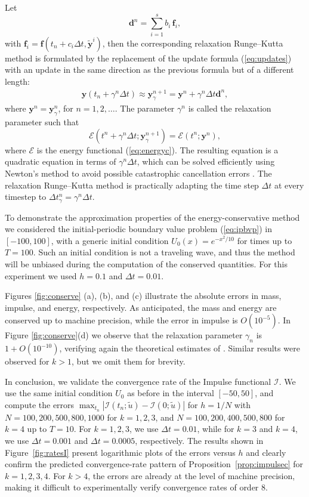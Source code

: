 \documentclass{amsart}
\newcommand{\bd}{\mathbf{d}}
\newcommand{\by}{\mathbf{y}}
\newcommand{\btf}{\mathbf{f}}
\begin{document}
Let
$$\bd^n=\sum_{i=1}^s b_i \,\btf_i,$$
with $\btf_i=\btf(t_n+c_i\Delta t,\tilde{\by}^i)$, then the corresponding
relaxation Runge--Kutta method is formulated by the replacement of the update
formula (\ref{eq:updates}) with an update in the same direction as the previous
formula but of a different length:
\begin{align}\label{eq:rrkupdate}
\by(t_n+\gamma^n\Delta t)\approx \by_\gamma^{n+1}=\by^n+\gamma^n\Delta t \bd^n,
\end{align}
where $\by^n=\by^{n}_\gamma$, for $n=1,2,\ldots$.
The parameter $\gamma^n$ is called the relaxation parameter such that
$$\mathcal{E}(t^{n}+\gamma^n\Delta t; \by^{n+1}_\gamma)=\mathcal{E}(t^n;\by^n),$$
where $\mathcal{E}$ is the energy functional (\ref{eq:energyc}). The resulting equation is a quadratic equation in terms of $\gamma^n \Delta t$, which can be solved efficiently using Newton's method to avoid possible catastrophic cancellation errors \cite{Mitsotakis2023, Mitsotakis2025}.
The relaxation Runge--Kutta method is practically adapting the time step $\Delta t$ at every timestep to $\Delta t^n_\gamma=\gamma^n\Delta t$.




To demonstrate the approximation properties of the energy-conservative method we considered the initial-periodic boundary value problem (\ref{eq:ipbvp}) in $[-100,100]$, with a generic initial condition $U_0(x)=e^{-x^2/10}$ for times up to $T=100$. Such an initial condition is not a traveling wave, and thus the method will be unbiased during the computation of the conserved quantities. For this experiment we used $h=0.1$ and $\Delta t=0.01$.


Figures \ref{fig:conserve} (a), (b), and (c) illustrate the absolute errors in mass, impulse, and energy, respectively. As anticipated, the mass and energy are conserved up to machine precision, while the error in impulse is $O(10^{-5})$. In Figure \ref{fig:conserve}(d) we observe that the relaxation parameter $\gamma_n$ is $1+O(10^{-10})$, verifying again the theoretical estimates of \cite{KE2019}. Similar results were observed for $k>1$, but we omit them for brevity. 

In conclusion, we validate the convergence rate of the Impulse functional $\mathcal{I}$. We use the same initial condition $U_0$ as before in the interval $[-50, 50]$, and compute the errors $\max_{t_n} |\mathcal{I}(t_n; \tilde{u}) - \mathcal{I}(0; \tilde{u})|$ for $h = 1/N$ with $N = 100, 200, 500, 800, 1000$ for $k = 1, 2, 3$, and $N = 100, 200, 400, 500, 800$ for $k = 4$ up to $T=10$. For $k = 1, 2, 3$, we use $\Delta t = 0.01$, while for $k = 3$ and $k = 4$, we use $\Delta t = 0.001$ and $\Delta t = 0.0005$, respectively. The results shown in Figure~\ref{fig:ratesI} present logarithmic plots of the errors versus $h$ and clearly confirm the predicted convergence-rate pattern of Proposition~\ref{prop:impulsec} for $k=1,2,3,4$. For $k>4$, the errors are already at the level of machine precision, making it difficult to experimentally verify convergence rates of order $8$.
\end{document}
